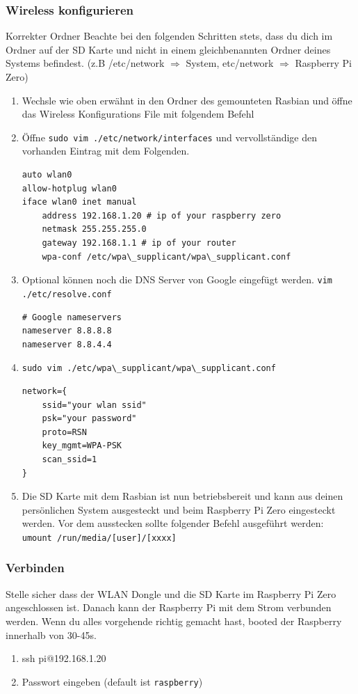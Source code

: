 \subsubsection{Wireless konfigurieren}
\begin{remember}{Korrekter Ordner}{}
Beachte bei den folgenden Schritten stets, dass du dich im Ordner auf der SD Karte und nicht in einem gleichbenannten Ordner deines Systems befindest. (z.B /etc/network $\Rightarrow$ System, etc/network $\Rightarrow$ Raspberry Pi Zero)
\end{remember}
\begin{enumerate}
	\item Wechsle wie oben erwähnt in den Ordner des gemounteten Rasbian und öffne das Wireless Konfigurations File mit folgendem Befehl
	\item Öffne \lstinline|sudo vim ./etc/network/interfaces| und vervollständige den vorhanden Eintrag mit dem Folgenden. 
\begin{lstlisting}[caption=/etc/network/interfaces]
auto wlan0
allow-hotplug wlan0
iface wlan0 inet manual
	address 192.168.1.20 # ip of your raspberry zero
	netmask 255.255.255.0
	gateway 192.168.1.1 # ip of your router
	wpa-conf /etc/wpa\_supplicant/wpa\_supplicant.conf
\end{lstlisting}
	\item Optional können noch die DNS Server von Google eingefügt werden. \lstinline|vim ./etc/resolve.conf|
\begin{lstlisting}[caption=/etc/resolve.conf]
# Google nameservers
nameserver 8.8.8.8
nameserver 8.8.4.4
\end{lstlisting}
	\item \lstinline|sudo vim ./etc/wpa\_supplicant/wpa\_supplicant.conf|
\begin{lstlisting}[caption=/etc/wpa\_supplicant/wpa\_supplicant.conf]
network={
	ssid="your wlan ssid"
	psk="your password"
	proto=RSN
	key_mgmt=WPA-PSK
	scan_ssid=1
}
\end{lstlisting}
	\item Die SD Karte mit dem Rasbian ist nun betriebsbereit und kann aus deinen persönlichen System ausgesteckt und beim Raspberry Pi Zero eingesteckt werden. Vor dem ausstecken sollte folgender Befehl ausgeführt werden: \lstinline|umount /run/media/[user]/[xxxx]|
\end{enumerate}

\subsubsection{Verbinden}
Stelle sicher dass der WLAN Dongle und die SD Karte im Raspberry Pi Zero angeschlossen ist. Danach kann der Raspberry Pi mit dem Strom verbunden werden. Wenn du alles vorgehende richtig gemacht hast, booted der Raspberry innerhalb von 30-45s.
\begin{enumerate}
	\item ssh pi@192.168.1.20
	\item Passwort eingeben (default ist \lstinline|raspberry|)
\end{enumerate}

